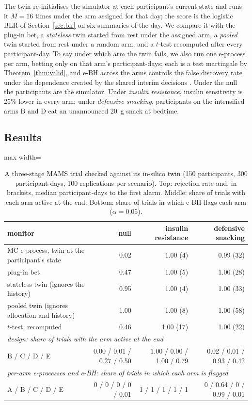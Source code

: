 \documentclass[12pt]{article}
\theoremstyle{remark}
\def\spacingset#1{\renewcommand{\baselinestretch}%
{#1}\small\normalsize} \spacingset{1}
\begin{document}
The twin re-initialises the simulator at each participant's current state and
runs it $M = 16$ times under the arm assigned for that day; the score is the
logistic BLR of Section~\ref{sec:blr} on six summaries of the day. We compare
it with the plug-in bet, a \emph{stateless} twin started from rest under the
assigned arm, a \emph{pooled} twin started from rest under a random arm, and a
$t$-test recomputed after every participant-day. To say under which arm the
twin fails, we also run one e-process per arm, betting only on that arm's
participant-days; each is a test martingale by Theorem~\ref{thm:valid}, and
e-BH \citep{wang2022false} across the arms controls the false discovery rate
under the dependence created by the shared interim decisions
\citep{xu2021unified}. Under the null the participants are the simulator. Under
\emph{insulin resistance}, insulin sensitivity is 25\% lower in every arm;
under \emph{defensive snacking}, participants on the intensified arms B and D
eat an unannounced 20~g snack at bedtime.

\subsection{Results}

\begin{table}[tp]
\spacingset{1}
\centering
\caption{A three-stage MAMS trial checked against its in-silico twin (150
participants, 300 participant-days, 100 replications per scenario). Top:
rejection rate and, in brackets, median participant-days to the first alarm.
Middle: share of trials with each arm active at the end. Bottom: share of
trials in which e-BH flags each arm ($\alpha = 0.05$).}
\label{tab:trial}
\begin{adjustbox}{max width=\textwidth}
\begin{tabular}{lrrr}
\toprule
monitor & null & insulin resistance & defensive snacking \\
\midrule
MC e-process, twin at the participant's state & 0.02 & 1.00 (4) & 0.99 (32) \\
plug-in bet & 0.47 & 1.00 (5) & 1.00 (28) \\
stateless twin (ignores the history) & 0.95 & 1.00 (4) & 1.00 (33) \\
pooled twin (ignores allocation and history) & 1.00 & 1.00 (8) & 1.00 (58) \\
$t$-test, recomputed & 0.46 & 1.00 (17) & 1.00 (22) \\
\midrule
\multicolumn{4}{l}{\emph{design: share of trials with the arm active at the end}} \\
B / C / D / E & 0.00 / 0.01 / 0.27 / 0.50 & 1.00 / 0.00 / 1.00 / 0.79 & 0.02 / 0.01 / 0.93 / 0.42 \\
\midrule
\multicolumn{4}{l}{\emph{per-arm e-processes and e-BH: share of trials in which each arm is flagged}} \\
A / B / C / D / E & 0 / 0 / 0 / 0 / 0.01 & 1 / 1 / 1 / 1 / 1 & 0 / 0.64 / 0 / 0.99 / 0.01 \\
\bottomrule
\end{tabular}
\end{adjustbox}
\end{table}
\end{document}
